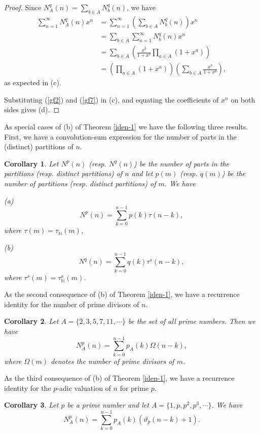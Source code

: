 \documentclass[11pt]{article}
\newtheorem{corollary}{Corollary}
\begin{document}
\begin{proof}
Since $N_A^q(n)=\sum_{b\in A}N_b^q(n)$, we have
\begin{align*}
\sum_{n=1}^{\infty}N^q_A(n)x^n&=\sum_{n=1}^{\infty}\left(\sum_{b\in A}N_b^q(n)\right)x^n\\ &=\sum_{b\in A}\sum_{n=1}^{\infty}N_b^q(n)x^n\\ 
&=\sum_{b\in A}\left(\frac{x^b}{1+x^b}\prod_{a\in A}(1+x^a)\right)\\
&=\left(\prod_{a\in A}(1+x^a)\right)\left(\sum_{b\in A}\frac{x^b}{1+x^b}\right),
\end{align*}
as expected in (c).

Substituting (\ref{gf2}) and (\ref{gf7}) in (c), and equating the coefficients of $x^n$ on both sides gives (d). 
\end{proof}
As special cases of (b) of Theorem \ref{iden-1} we have the following three results. First, we have a convolution-sum expression for the number of parts in the (distinct) partitions of $n$. 
\begin{corollary}Let $N^p(n)$ (resp. $N^q(n)$) be the number of parts in the partitions (resp. distinct partitions) of $n$ and let $p(m)$ (resp. $q(m)$)  be the number of partitions (resp. distinct partitions) of $m$.
We have
\begin{description}
\item{(a)}
\begin{equation}
N^p(n)=\sum_{k=0}^{n-1}p(k)\tau(n-k),
\end{equation}
where $\tau(m)=\tau_{\mathbb N}(m)$,
\item{(b)} 
\begin{equation}
N^q(n)=\sum_{k=0}^{n-1}q(k)\tau^s(n-k),
\end{equation}
where $\tau^s(m)=\tau^s_{\mathbb N}(m)$.
\end{description}
\end{corollary}
As the second consequence of (b) of Theorem \ref{iden-1}, we have a recurrence identity for the number of prime divisors of $n$.
\begin{corollary}
Let $A=\{2,3,5,7,11,\cdots\}$ be the set of all prime numbers. Then we have
\begin{equation}
N^p_A(n)=\sum_{k=0}^{n-1}p_A(k)\Omega(n-k),
\end{equation} 
where $\Omega(m)$ denotes the number of prime divisors of $m$.
\end{corollary}
As the third consequence of (b) of Theorem \ref{iden-1}, we have a recurrence identity for the $p$-adic valuation of $n$ for prime $p$. 
\begin{corollary}
Let $p$ be a prime number and let $A=\{1,p,p^2,p^3,\cdots \}$. We have
\begin{equation}
N^p_A(n)=\sum_{k=0}^{n-1}p_A(k)\left(\vartheta_p(n-k)+1\right).
\end{equation}
\end{corollary}
\end{document}
